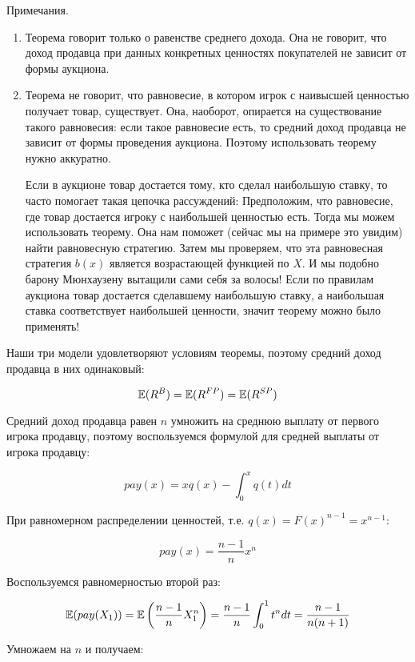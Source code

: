 Примечания. 
\begin{enumerate}
\item Теорема говорит только о равенстве среднего дохода. Она не говорит, что доход продавца при данных конкретных ценностях покупателей не зависит от формы аукциона. 
\item Теорема не говорит, что равновесие, в котором игрок с наивысшей ценностью получает товар, существует. Она, наоборот, опирается на существование такого равновесия: если такое равновесие есть, то средний доход продавца не зависит от формы проведения аукциона. Поэтому использовать теорему нужно аккуратно. 

Если в аукционе товар достается тому, кто сделал наибольшую ставку, то часто помогает такая цепочка рассуждений: Предположим, что равновесие, где товар достается игроку с наибольшей ценностью есть. Тогда мы можем использовать теорему. Она нам поможет (сейчас мы на примере это увидим) найти равновесную стратегию. Затем мы проверяем, что эта равновесная стратегия $ b(x) $ является возрастающей функцией по $ X $. И мы подобно барону Мюнхаузену вытащили сами себя за волосы! Если по правилам аукциона товар достается сделавшему наибольшую ставку, а наибольшая ставка соответствует наибольшей ценности, значит теорему можно было применять!
\end{enumerate}


Наши три модели удовлетворяют условиям теоремы, поэтому средний доход продавца в них одинаковый:

\[ \mathbb{E}(R^{B})=\mathbb{E}(R^{FP})=\mathbb{E}(R^{SP}) \]

Средний доход продавца равен $ n $ умножить на среднюю выплату от первого игрока продавцу, поэтому воспользуемся формулой для средней выплаты от игрока продавцу: 

\[ pay(x)=xq(x)-\int_{0}^{x}q(t)dt \]

При равномерном распределении ценностей, т.е. $ q(x)=F(x)^{n-1}=x^{n-1} $:

\begin{equation}
pay(x)=\frac{n-1}{n}x^{n}
\end{equation}

Воспользуемся равномерностью второй раз:

\begin{equation}
\mathbb{E}(pay(X_{1}))=\mathbb{E}\left(\frac{n-1}{n}X_{1}^{n}\right)=\frac{n-1}{n}\int_{0}^{1} t^{n} dt=\frac{n-1}{n(n+1)}
\end{equation}

Умножаем на $ n $ и получаем:

